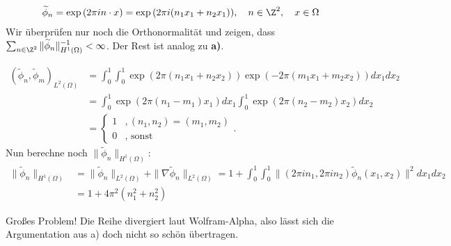 \begin{solution}
\begin{enumerate}[label = \textbf{\alph*)}]
  \begin{align*}
    \widetilde{\phi}_n
    =
    \exp{(2 \pi i n \cdot x)}
    =
    \exp{(2 \pi i (n_1 x_1 + n_2 x_1))},
    \quad
    n \in \Z^2,
    \quad
    x \in \Omega
  \end{align*}
  Wir überprüfen nur noch die Orthonormalität und zeigen, dass
  $\sum_{n \in \Z^2}\|\widetilde{\phi}_n\|_{H^1(\Omega)}^{-1} < \infty$.
  Der Rest ist analog zu \textbf{a)}.

  \begin{align*}
    (\widetilde{\phi}_n, \widetilde{\phi}_m)_{L^2(\Omega)}
    &= \int_0^1\int_0^1\exp(2\pi(n_1x_1 + n_2x_2))\exp(-2\pi(m_1x_1 + m_2x_2)) dx_1 dx_2 \\
    &= \int_0^1\exp(2\pi(n_1 - m_1)x_1)dx_1 \int_0^1\exp(2\pi(n_2 - m_2)x_2)dx_2 \\
    &= \begin{cases}
      1 &, (n_1,n_2) = (m_1,m_2) \\
      0 &, \text{ sonst}
    \end{cases}.
  \end{align*}
  Nun berechne noch $\|\widetilde{\phi}_n\|_{H^1(\Omega)}$:
  \begin{align*}
    \|\widetilde{\phi}_n\|_{H^1(\Omega)}
    &= \|\widetilde{\phi}_n\|_{L^2(\Omega)}  + \|\nabla \widetilde{\phi}_n\|_{L^2(\Omega)}
    = 1 + \int_0^1\int_0^1 \|(2\pi in_1, 2\pi in_2)\widetilde{\phi}_n(x_1,x_2)\|^2 dx_1 dx_2 \\
    &= 1 + 4\pi^2(n_1^2 + n_2^2)
  \end{align*}

  Großes Problem! Die Reihe divergiert laut Wolfram-Alpha, also
  lässt sich die Argumentation aus a) doch nicht so schön übertragen.
\end{enumerate}

\end{solution}

